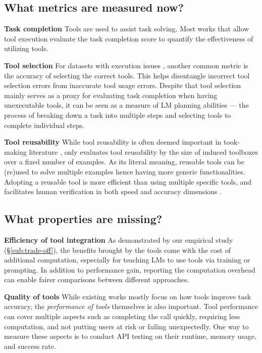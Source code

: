 \subsection{What metrics are measured now?}
\label{sub:eval-metrics}

\noindent \textbf{Task completion} \quad
Tools are used to assist task solving. Most works that allow tool execution evaluate the task completion score to quantify the effectiveness of utilizing tools.

\noindent \textbf{Tool selection} \quad
For datasets with execution issues \citep{huang2024metatool,shen2023taskbench}, another common metric is the accuracy of selecting the correct tools. This helps disentangle incorrect tool selection errors from inaccurate tool usage errors. 
Despite that tool selection mainly serves as a proxy for evaluating task completion when having unexecutable tools, it can be seen as a measure of LM planning abilities --- the process of breaking down a task into multiple steps and selecting tools to complete individual steps.

\noindent \textbf{Tool reusability} \quad
While tool reusability is often deemed important in took-making literature \citep{cai2023large,yuan2023craft}, only \citet{wang2024trove} evaluates tool reusability by the size of induced toolboxes over a fixed number of examples. As its literal meaning, reusable tools can be (re)used to solve multiple examples hence having more generic functionalities. Adopting a reusable tool is more efficient than using multiple specific tools, and facilitates human verification in both speed and accuracy dimensions \citep{wang2024trove}.


\subsection{What properties are missing?}
\label{sub:desired-properties}

\noindent \textbf{Efficiency of tool integration} \quad
As demonstrated by our empirical study (\S\ref{sub:trade-off}), the benefits brought by the tools come with the cost of additional computation, especially for teaching LMs to use tools via training or prompting. In addition to performance gain, reporting the computation overhead can enable fairer comparisons between different approaches.

\noindent \textbf{Quality of tools} \quad
While existing works mostly focus on how tools improve task accuracy, the \textit{performance of tools} themselves is also important. Tool performance can cover multiple aspects such as completing the call quickly, requiring less computation, and not putting users at risk or failing unexpectedly. 
One way to measure these aspects is to conduct API testing \citep{yasar2022software,ehsan2022restful} on their runtime, memory usage, and success rate.


